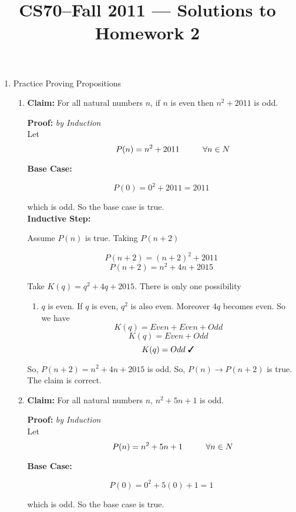 \documentclass[11pt]{article}
\title{CS70--Fall 2011 --- Solutions to Homework 2}
\newcommand{\cmark}{\ding{51}}%
\newcommand\tab[1][1cm]{\hspace*{#1}}
\begin{document}
	\maketitle
	
	\begin{enumerate}
		\item Practice Proving Propositions
		
		\begin{enumerate}
			\item \textbf{Claim:} For all natural numbers $n$, if $n$ is even then $n^2+2011$ is odd.
			
			\textbf{Proof:} \textit{by Induction} \\
			Let $$ \tab P(n) = n^2+2011 \tab \forall n \in N$$
			
			\textbf{Base Case:} 
			
			$$P(0) = 0^2 + 2011 = 2011$$
			
			which is odd. So the base case is true.\\
			
			\textbf{Inductive Step:}
			
			Assume $P(n)$ is true. Taking $P(n+2)$
			
			$$P(n+2) = (n+2)^2+2011$$  
			$$P(n+2) = n^2 + 4n + 2015$$ 
						
			Take $K(q) = q^2 + 4q + 2015$. There is only one possibility 
			\begin{enumerate} 
							
				\item $q$ is even. If $q$ is even, $q^2$ is also even. Moreover $4q$ becomes even. So we have
				$$K(q) = Even + Even + Odd $$ 
				$$K(q) = Even + Odd $$ 
				$$K(q) = Odd \text{ \cmark}$$ 
							
			\end{enumerate}
			
			So, $P(n+2) = n^2 + 4n + 2015$ is odd. So, $P(n) \rightarrow P(n+2)$ is true. The claim is correct. \cmark \\
		
			\item \textbf{Claim:} For all natural numbers $n$, $n^2+5n+1$ is odd.
			
			\textbf{Proof:} \textit{by Induction} \\
			Let $$ \tab P(n) = n^2+5n+1 \tab \forall n \in N$$
			
			\textbf{Base Case:} 
			
			$$P(0) = 0^2 + 5(0) + 1 = 1$$
			
			which is odd. So the base case is true.\\
			

\end{enumerate}
\end{enumerate}
\end{document}
